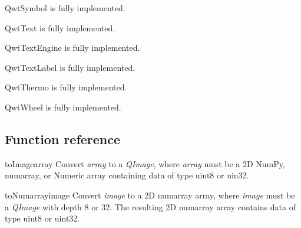 \documentclass[a4paper,10pt,english]{manual}
\begin{document}
\hypertarget{PyQt4.Qwt5.QwtSymbol}{}\begin{classdesc}{QwtSymbol}{}
is fully implemented.
\end{classdesc}

\hypertarget{PyQt4.Qwt5.QwtText}{}\begin{classdesc}{QwtText}{}
is fully implemented.
\end{classdesc}

\hypertarget{PyQt4.Qwt5.QwtTextEngine}{}\begin{classdesc}{QwtTextEngine}{}
is fully implemented.
\end{classdesc}

\hypertarget{PyQt4.Qwt5.QwtTextLabel}{}\begin{classdesc}{QwtTextLabel}{}
is fully implemented.
\end{classdesc}

\hypertarget{PyQt4.Qwt5.QwtThermo}{}\begin{classdesc}{QwtThermo}{}
is fully implemented.
\end{classdesc}

\hypertarget{PyQt4.Qwt5.QwtWheel}{}\begin{classdesc}{QwtWheel}{}
is fully implemented.
\end{classdesc}


\subsection{Function reference}

\hypertarget{PyQt4.Qwt5.toImage}{}\begin{funcdesc}{toImage}{array}
Convert \emph{array} to a \emph{QImage}, where \emph{array} must be a 2D NumPy,
numarray, or Numeric array containing data of type uint8 or uin32.
\end{funcdesc}

\hypertarget{PyQt4.Qwt5.toNumarray}{}\begin{funcdesc}{toNumarray}{image}
Convert \emph{image} to a 2D numarray array, where \emph{image} must be a
\emph{QImage} with depth 8 or 32.  The resulting 2D numarray array
contains data of type uint8 or uint32.
\end{funcdesc}
\end{document}
